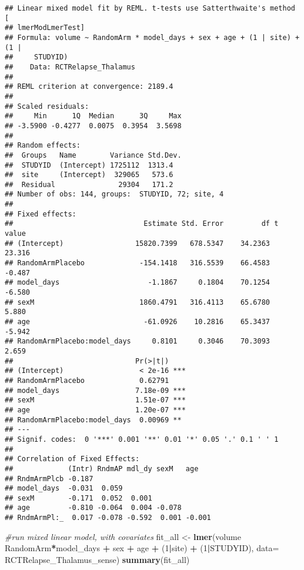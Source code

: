 \documentclass[]{article}
\newenvironment{Shaded}{\begin{snugshade}}{\end{snugshade}}
\newcommand{\KeywordTok}[1]{\textcolor[rgb]{0.13,0.29,0.53}{\textbf{#1}}}
\newcommand{\DataTypeTok}[1]{\textcolor[rgb]{0.13,0.29,0.53}{#1}}
\newcommand{\DecValTok}[1]{\textcolor[rgb]{0.00,0.00,0.81}{#1}}
\newcommand{\StringTok}[1]{\textcolor[rgb]{0.31,0.60,0.02}{#1}}
\newcommand{\CommentTok}[1]{\textcolor[rgb]{0.56,0.35,0.01}{\textit{#1}}}
\newcommand{\OperatorTok}[1]{\textcolor[rgb]{0.81,0.36,0.00}{\textbf{#1}}}
\newcommand{\NormalTok}[1]{#1}
\theoremstyle{definition}
\theoremstyle{definition}
\theoremstyle{definition}
\theoremstyle{remark}
\begin{document}
\begin{verbatim}
## Linear mixed model fit by REML. t-tests use Satterthwaite's method [
## lmerModLmerTest]
## Formula: volume ~ RandomArm * model_days + sex + age + (1 | site) + (1 |  
##     STUDYID)
##    Data: RCTRelapse_Thalamus
## 
## REML criterion at convergence: 2189.4
## 
## Scaled residuals: 
##     Min      1Q  Median      3Q     Max 
## -3.5900 -0.4277  0.0075  0.3954  3.5698 
## 
## Random effects:
##  Groups   Name        Variance Std.Dev.
##  STUDYID  (Intercept) 1725112  1313.4  
##  site     (Intercept)  329065   573.6  
##  Residual               29304   171.2  
## Number of obs: 144, groups:  STUDYID, 72; site, 4
## 
## Fixed effects:
##                               Estimate Std. Error         df t value
## (Intercept)                 15820.7399   678.5347    34.2363  23.316
## RandomArmPlacebo             -154.1418   316.5539    66.4583  -0.487
## model_days                     -1.1867     0.1804    70.1254  -6.580
## sexM                         1860.4791   316.4113    65.6780   5.880
## age                           -61.0926    10.2816    65.3437  -5.942
## RandomArmPlacebo:model_days     0.8101     0.3046    70.3093   2.659
##                             Pr(>|t|)    
## (Intercept)                  < 2e-16 ***
## RandomArmPlacebo             0.62791    
## model_days                  7.18e-09 ***
## sexM                        1.51e-07 ***
## age                         1.20e-07 ***
## RandomArmPlacebo:model_days  0.00969 ** 
## ---
## Signif. codes:  0 '***' 0.001 '**' 0.01 '*' 0.05 '.' 0.1 ' ' 1
## 
## Correlation of Fixed Effects:
##             (Intr) RndmAP mdl_dy sexM   age   
## RndmArmPlcb -0.187                            
## model_days  -0.031  0.059                     
## sexM        -0.171  0.052  0.001              
## age         -0.810 -0.064  0.004 -0.078       
## RndmArmPl:_  0.017 -0.078 -0.592  0.001 -0.001
\end{verbatim}

\begin{Shaded}
\begin{Highlighting}[]
\CommentTok{#run mixed linear model, with covariates}
\NormalTok{  fit_all <-}\StringTok{ }\KeywordTok{lmer}\NormalTok{(volume }\OperatorTok{~}\StringTok{ }\NormalTok{RandomArm}\OperatorTok{*}\NormalTok{model_days }\OperatorTok{+}\StringTok{ }\NormalTok{sex }\OperatorTok{+}\StringTok{ }\NormalTok{age }\OperatorTok{+}\StringTok{ }\NormalTok{(}\DecValTok{1}\OperatorTok{|}\NormalTok{site) }\OperatorTok{+}\StringTok{ }\NormalTok{(}\DecValTok{1}\OperatorTok{|}\NormalTok{STUDYID), }\DataTypeTok{data=}\NormalTok{ RCTRelapse_Thalamus_sense)}
  \KeywordTok{summary}\NormalTok{(fit_all)  }
\end{Highlighting}
\end{Shaded}
\end{document}
